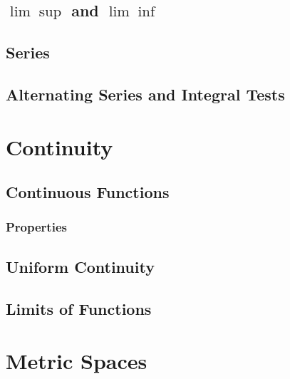 \documentclass[12pt, english]{book}
\begin{document}
	\section{\texorpdfstring{\(\lim \operatorname{sup}\)}{TEXT} and \texorpdfstring{\(\lim \operatorname{inf}\)}{TEXT}} \label{lim sup and lim inf Section - Real Analysis}
	
	\section{Series} \label{Series Section - Real Analysis}
	
	\section{Alternating Series and Integral Tests} \label{Alternating Series and Integral Tests Section - Real Analysis}
	
	\chapter{Continuity} \label{Continuity Chapter - Real Analysis}
	
	\section{Continuous Functions} \label{Continuous Functions Section - Real Analysis}
	
	\subsection{Properties} \label{Properties of Continuous Functions Subsection - Real Analysis}
	
	\section{Uniform Continuity} \label{Uniform Continuity Section - Real Analysis}
	
	\section{Limits of Functions} \label{Limits of Functions Section - Real Analysis}

	\chapter{Metric Spaces}	
	
\end{document}
